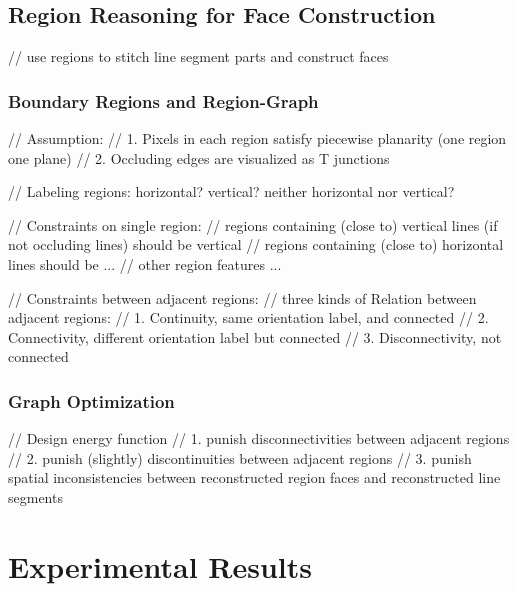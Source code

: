 \documentclass[runningheads]{llncs}
\begin{document}
\subsection{Region Reasoning for Face Construction}

// use regions to stitch line segment parts and construct faces

\subsubsection {Boundary Regions and Region-Graph} %

// Assumption:
// 1. Pixels in each region satisfy piecewise planarity (one region one plane)
// 2. Occluding edges are visualized as T junctions

// Labeling regions: horizontal? vertical? neither horizontal nor vertical?


// Constraints on single region:
//  regions containing (close to) vertical lines (if not occluding lines) should be vertical 
//  regions containing (close to) horizontal lines should be ...
//	other region features ...

// Constraints between adjacent regions:
//   three kinds of Relation between adjacent regions:
//   1. Continuity, same orientation label, and connected
//   2. Connectivity, different orientation label but connected
//   3. Disconnectivity, not connected



\subsubsection {Graph Optimization}

// Design energy function
//  1. punish disconnectivities between adjacent regions
//  2. punish (slightly) discontinuities between adjacent regions
//  3. punish spatial inconsistencies between reconstructed region faces and reconstructed line segments

\section{Experimental Results}

\subsection {}
\end{document}
